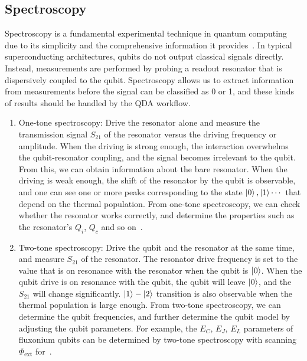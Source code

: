 \documentclass[a4paper,onecolumn,11pt,unpublished]{quantumarticle}
\newcommand{\Phiext}{\Phi_{\mathrm{ext}}}
\begin{document}
\subsection{Spectroscopy}
Spectroscopy is a fundamental experimental technique in quantum computing due to its simplicity and the comprehensive information it provides~\cite{Naghiloo2019Introduction}. In typical superconducting architectures, qubits do not output classical signals directly. Instead, measurements are performed by probing a readout resonator that is dispersively coupled to the qubit. Spectroscopy allows us to extract information from measurements before the signal can be classified as 0 or 1, and these kinds of results should be handled by the QDA workflow.
\begin{enumerate}
  \item One-tone spectroscopy: Drive the resonator alone and measure the transmission signal $S_{21}$ of the resonator versus the driving frequency or amplitude. When the driving is strong enough, the interaction overwhelms the qubit-resonator coupling, and the signal becomes irrelevant to the qubit. From this, we can obtain information about the bare resonator. When the driving is weak enough, the shift of the resonator by the qubit is observable, and one can see one or more peaks corresponding to the state $\ket{0},\ket{1}\cdots$ that depend on the thermal population. From one-tone spectroscopy, we can check whether the resonator works correctly, and determine the properties such as the resonator's $Q_i$, $Q_c$ and so on~\cite{Boehme2016Characterisation,Zmuidzinas2012Superconducting}.
  \item Two-tone spectroscopy: Drive the qubit and the resonator at the same time, and measure $S_{21}$ of the resonator. The resonator drive frequency is set to the value that is on resonance with the resonator when the qubit is $\ket{0}$. When the qubit drive is on resonance with the qubit, the qubit will leave $\ket{0}$, and the $S_{21}$ will change significantly. $\ket{1}-\ket{2}$ transition is also observable when the thermal population is large enough. From two-tone spectroscopy, we can determine the qubit frequencies, and further determine the qubit model by adjusting the qubit parameters. For example, the $E_C$, $E_J$, $E_L$ parameters of fluxonium qubits can be determined by two-tone spectroscopy with scanning $\Phiext$ for~\cite{Nguyen2019HighCoherence}.
\end{enumerate}
\end{document}
